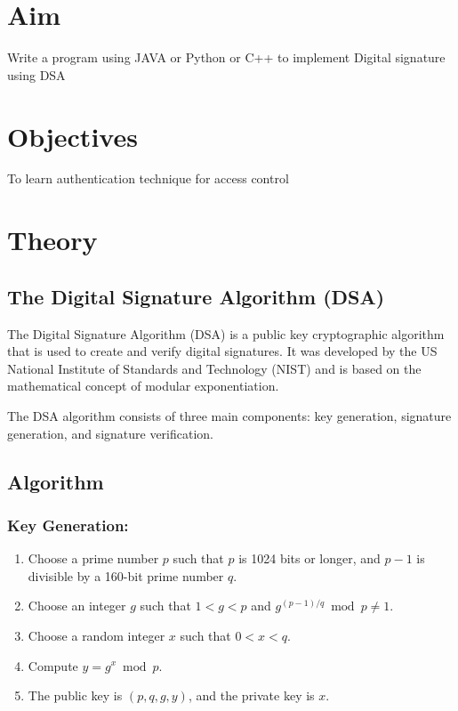 \documentclass[11pt]{article}
\begin{document}
\tableofcontents
\thispagestyle{empty}
\clearpage

\setcounter{page}{1}

\section{Aim}
Write a program using JAVA or Python or C++ to implement Digital signature using DSA

\section{Objectives}
To learn authentication technique for access control

\section{Theory}

\subsection{The Digital Signature Algorithm (DSA)}

The Digital Signature Algorithm (DSA) is a public key cryptographic algorithm that is used to create and verify digital signatures. It was developed by the US National Institute of Standards and Technology (NIST) and is based on the mathematical concept of modular exponentiation.

The DSA algorithm consists of three main components: key generation, signature generation, and signature verification.

\subsection{Algorithm}

\subsubsection{Key Generation:}

\begin{enumerate}
    \item Choose a prime number $p$ such that $p$ is 1024 bits or longer, and $p-1$ is divisible by a 160-bit prime number $q$.
    \item Choose an integer $g$ such that $1 < g < p$ and $g^{(p-1)/q} \bmod p \neq 1$.
    \item Choose a random integer $x$ such that $0 < x < q$.
    \item Compute $y = g^x \bmod p$.
    \item The public key is $(p, q, g, y)$, and the private key is $x$.
\end{enumerate}
\end{document}
